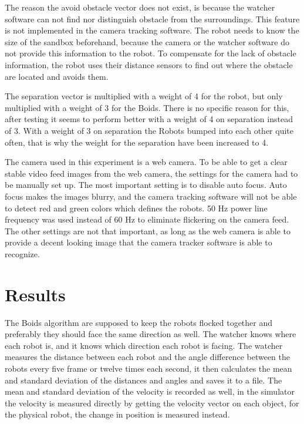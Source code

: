 The reason the avoid obstacle vector does not exist, is because the watcher software can not find nor distinguish obstacle from the surroundings. This feature is not implemented in the camera tracking software. The robot needs to know the size of the sandbox beforehand, because the camera or the watcher software do not provide this information to the robot. To compensate for the lack of obstacle information, the robot uses their distance sensors to find out where the obstacle are located and avoids them.

The separation vector is multiplied with a weight of 4 for the robot, but only multiplied with a weight of 3 for the Boids. There is no specific reason for this, after testing it seems to perform better with a weight of 4 on separation instead of 3.
With a weight of 3 on separation the Robots bumped into each other quite often, that is why the weight for the separation have been increased to 4.

The camera used in this experiment is a web camera. To be able to get a clear stable video feed images from the web camera, the settings for the camera had to be manually set up.
The most important setting is to disable auto focus. Auto focus makes the images blurry, and the camera tracking software will not be able to detect red and green colors which defines the robots. 50 Hz power line frequency was used instead of 60 Hz to eliminate flickering on the camera feed. The other settings are not that important, as long as the web camera is able to provide a decent looking image that the camera tracker software is able to recognize.





\section{Results}
\label{sec:results}

The Boids algorithm are supposed to keep the robots flocked together and preferably they should face the same direction as well. The watcher knows where each robot is, and it knows which direction each robot is facing. The watcher measures the distance between each robot and the angle difference between the robots every five frame or twelve times each second, it then calculates the mean and standard deviation of the distances and angles and saves it to a file. The mean and standard deviation of the velocity is recorded as well, in the simulator the velocity is measured directly by getting the velocity vector on each object, for the physical robot, the change in position is measured instead.

